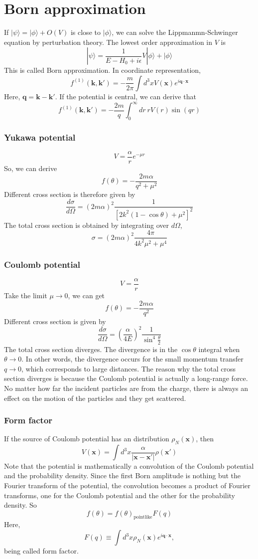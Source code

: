 \section{Born approximation}
If $|\psi\rangle = |\phi\rangle + O(V)$ is close to $|\phi\rangle$, we can solve the Lippmanmn-Schwinger equation by perturbation theory. The lowest order approximation in $V$ is
\[|\psi\rangle = \frac{1}{E-H_0 + i\epsilon} V|\phi\rangle + |\phi\rangle\]
This is called Born approximation. In coordinate representation,
\[f^{(1)}(\bm{k},\bm{k}') = - \frac{m}{2\pi} \int d^3x V(\bm{x}) e^{i\bm{q}\cdot\bm{x}}\]
Here, $\bm{q} = \bm{k} - \bm{k}'$. If the potential is central, we can derive that
\[f^{(1)}(\bm{k},\bm{k}') = - \frac{2m}{q} \int_0^{\infty} dr \: r V(r) \sin(qr)\]

\subsubsection{Yukawa potential}
\[V = \frac{\alpha}{r}  e^{-\mu r}\]
So, we can derive
\[f(\theta) = - \frac{2m\alpha}{q^2 + \mu^2}\]
Different cross section is therefore given by
\[\frac{d\sigma}{d\Omega} = (2m\alpha)^2 \frac{1}{[2k^2(1-\cos\theta) + \mu^2]^2}\]
The total cross section is obtained by integrating over $d\Omega$,
\[\sigma = (2m\alpha)^2 \frac{4\pi}{4k^2\mu^2 + \mu^4}\]

\subsubsection{Coulomb potential}
\[V = \frac{\alpha}{r}\]
Take the limit $\mu \to 0$, we can get
\[f(\theta) = - \frac{2m\alpha}{q^2}\]
Different cross section is given by
\[\frac{d\sigma}{d\Omega} = (\frac{\alpha}{4E})^2 \frac{1}{\sin^4{\frac{\theta}{2}}}\]
The total cross section diverges. The divergence is in the $\cos\theta$ integral when $\theta \to 0$. In other words, the divergence occurs for the small momentum transfer $q \to 0$, which corresponds to large distances.
The reason why the total cross section diverges is because the Coulomb potential is actually a long-range force. No matter how far the incident particles are from the charge, there is always an effect on the motion of the particles and they get scattered.

\subsubsection{Form factor}
\noindent
If the source of Coulomb potential has an distribution $\rho_N(\bm{x})$, then
\[V(\bm{x}) = \int d^3x \frac{\alpha}{|\bm{x}-\bm{x}'|} \rho(\bm{x}')\]
Note that the potential is mathematically a convolution of the Coulomb potential and the probability density. Since the first Born amplitude is nothing but the Fourier transform of the potential, the convolution becomes a product of Fourier transforms, one for the Coulomb potential and the other for the probability density. So
\[f(\theta) = f(\theta)_{\mathrm{pointlike}} F(q)\]
Here,
\[F(q) \equiv \int d^3x \rho_N(\bm{x}) e^{i \bm{q} \cdot \bm{x}},\]
being called form factor.


